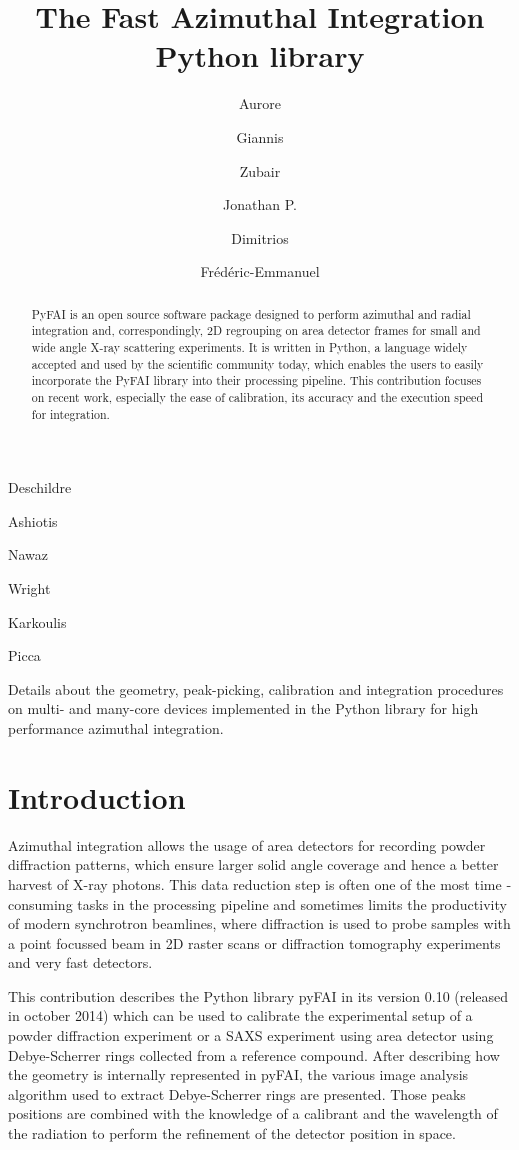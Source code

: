 \documentclass[preprint]{iucr}
\begin{document}
\title{The Fast Azimuthal Integration Python library}

    \author[a]{Aurore}{Deschildre}
    \author[a]{Giannis}{Ashiotis}
    \author[b]{Zubair}{Nawaz}
    \author[a]{Jonathan P.}{Wright}
    \author[a]{Dimitrios}{Karkoulis}
    \author[c]{Fr\'ed\'eric-Emmanuel}{Picca}

\maketitle

\begin{synopsis}
Details about the geometry, peak-picking, calibration and integration procedures
on multi- and many-core devices implemented in the Python library for high
performance azimuthal integration.
\end{synopsis}

\begin{abstract}
PyFAI is an open source software package designed to perform azimuthal and
radial integration and, correspondingly, 2D regrouping on area detector frames for small and wide
angle X-ray scattering experiments.
It is written in Python, a language widely accepted and used by the scientific
community today, which enables the users to easily incorporate the PyFAI
library into their processing pipeline.
This contribution focuses on recent work, especially the ease of
calibration, its accuracy and the execution speed for integration.
\end{abstract}

\section{Introduction}
Azimuthal integration allows the usage of area detectors for recording powder
diffraction patterns, which  ensure larger solid angle coverage and hence a
better harvest of X­-ray photons.
This data reduction step is often one of the most time ­consuming tasks in the
processing pipeline and sometimes limits the productivity of modern synchrotron
beamlines, where diffraction is used to probe samples with a point focussed
beam in 2D raster scans or diffraction tomography experiments and
very fast detectors.

This contribution describes the Python library pyFAI in its version 0.10
(released in october 2014) which can be used to calibrate the experimental
setup of a powder diffraction experiment or a SAXS experiment using area
detector using Debye-Scherrer rings collected from a reference compound.
After describing how the geometry is internally represented in pyFAI, the
various image analysis algorithm used to extract Debye-Scherrer rings are presented.
Those peaks positions are combined with the knowledge of a calibrant and the
wavelength of the radiation to perform the refinement of the detector position
in space.
\end{document}
